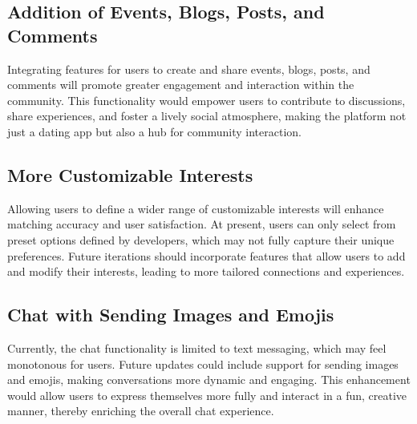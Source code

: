     \subsection{Addition of Events, Blogs, Posts, and Comments}
    Integrating features for users to create and share events, blogs, posts, and comments will promote greater engagement and interaction within the community. This functionality would empower users to contribute to discussions, share experiences, and foster a lively social atmosphere, making the platform not just a dating app but also a hub for community interaction.
    
    \subsection{More Customizable Interests}
    Allowing users to define a wider range of customizable interests will enhance matching accuracy and user satisfaction. At present, users can only select from preset options defined by developers, which may not fully capture their unique preferences. Future iterations should incorporate features that allow users to add and modify their interests, leading to more tailored connections and experiences.
    
    \subsection{Chat with Sending Images and Emojis}
    Currently, the chat functionality is limited to text messaging, which may feel monotonous for users. Future updates could include support for sending images and emojis, making conversations more dynamic and engaging. This enhancement would allow users to express themselves more fully and interact in a fun, creative manner, thereby enriching the overall chat experience.
